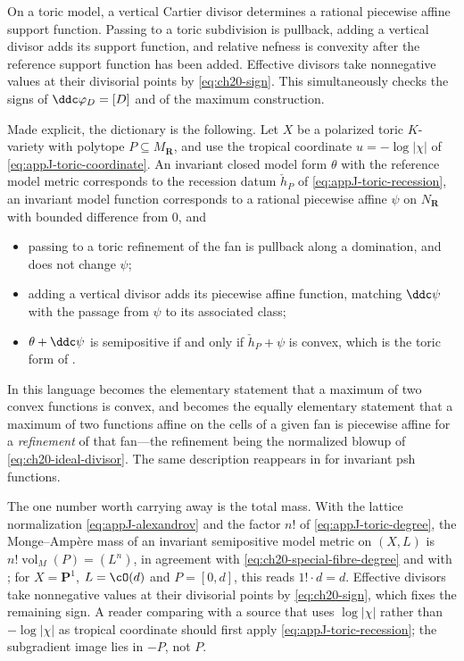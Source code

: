 \begin{example}
\label{ex:ch20-toric}
On a toric model, a vertical Cartier divisor determines a rational
piecewise affine support function.  Passing to a toric subdivision is
pullback, adding a vertical divisor adds its support function, and relative
nefness is convexity after the reference support function has been added.
Effective divisors take nonnegative values at their divisorial points by
\eqref{eq:ch20-sign}.  This simultaneously checks the signs of
$\ddc\varphi_D=[D]$ and of the maximum construction.

Made explicit, the dictionary is the following.  Let $X$ be a polarized
toric $K$-variety with polytope $P\subseteq M_{\mathbf R}$, and use the
tropical coordinate $u=-\log|\chi|$ of \eqref{eq:appJ-toric-coordinate}.
An invariant closed model form $\theta$ with the reference model metric
corresponds to the recession datum $\check h_P$ of
\eqref{eq:appJ-toric-recession}, an invariant model function corresponds to
a rational piecewise affine $\psi$ on $N_{\mathbf R}$ with bounded
difference from $0$, and
\begin{itemize}
\item passing to a toric refinement of the fan is pullback along a
 domination, and does not change $\psi$;
\item adding a vertical divisor adds its piecewise affine function, matching
 $\ddc\psi$ with the passage from $\psi$ to its associated class;
\item $\theta+\ddc\psi$ is semipositive if and only if
 $\check h_P+\psi$ is convex, which is the toric form of
 .
\end{itemize}
In this language  becomes the elementary statement
that a maximum of two convex functions is convex, and
 becomes the equally elementary statement
that a maximum of two functions affine on the cells of a given fan is
piecewise affine for a \emph{refinement} of that fan---the refinement being
the normalized blowup of \eqref{eq:ch20-ideal-divisor}.  The same
description reappears in  for invariant psh functions.

The one number worth carrying away is the total mass.  With the lattice
normalization \eqref{eq:appJ-alexandrov} and the factor $n!$ of
\eqref{eq:appJ-toric-degree}, the Monge--Amp\`ere mass of an invariant
semipositive model metric on $(X,L)$ is
$n!\operatorname{vol}_M(P)=(L^n)$, in agreement with
\eqref{eq:ch20-special-fibre-degree} and with
; for $X=\mathbf P^1$, $L=\cO(d)$ and
$P=[0,d]$, this reads $1!\cdot d=d$.  Effective divisors take
nonnegative values at their divisorial points by \eqref{eq:ch20-sign}, which
fixes the remaining sign.  A reader comparing with a source that uses
$\log|\chi|$ rather than $-\log|\chi|$ as tropical coordinate should
first apply \eqref{eq:appJ-toric-recession}; the subgradient image lies in
$-P$, not $P$.
\end{example}

